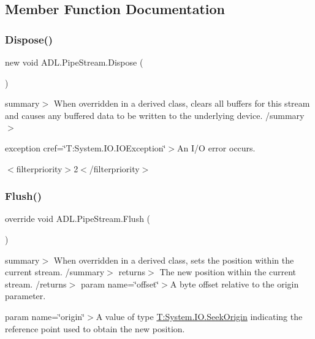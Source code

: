 \subsection{Member Function Documentation}
\mbox{\label{class_a_d_l_1_1_pipe_stream_a430dca29f0cd1ff4a27fc7bcafbe7a8f}} 
\subsubsection{\texorpdfstring{Dispose()}{Dispose()}}
{\footnotesize\ttfamily new void A\+D\+L.\+Pipe\+Stream.\+Dispose (\begin{DoxyParamCaption}{ }\end{DoxyParamCaption})}

summary$>$ When overridden in a derived class, clears all buffers for this stream and causes any buffered data to be written to the underlying device. /summary$>$

exception cref=\char`\"{}\+T\+:\+System.\+I\+O.\+I\+O\+Exception\char`\"{}$>$An I/O error occurs. 

$<$filterpriority$>$2$<$/filterpriority$>$ \mbox{\label{class_a_d_l_1_1_pipe_stream_aef56d04b8d784d6606ed348971eb29f3}} 
\subsubsection{\texorpdfstring{Flush()}{Flush()}}
{\footnotesize\ttfamily override void A\+D\+L.\+Pipe\+Stream.\+Flush (\begin{DoxyParamCaption}{ }\end{DoxyParamCaption})}

summary$>$ When overridden in a derived class, sets the position within the current stream. /summary$>$ returns$>$ The new position within the current stream. /returns$>$ param name=\char`\"{}offset\char`\"{}$>$A byte offset relative to the origin parameter. 

param name=\char`\"{}origin\char`\"{}$>$A value of type \mbox{\hyperlink{}{T\+:\+System.\+I\+O.\+Seek\+Origin}} indicating the reference point used to obtain the new position. 


